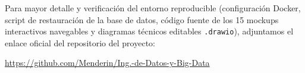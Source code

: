 \documentclass[11pt,letterpaper]{article}
\begin{document}
Para mayor detalle y verificación del entorno reproducible (configuración Docker, script de restauración de la base de datos, código fuente de los 15 mockups interactivos navegables y diagramas técnicos editables \texttt{.drawio}), adjuntamos el enlace oficial del repositorio del proyecto:

\begin{center}
    \url{https://github.com/Menderin/Ing.-de-Datos-y-Big-Data}
\end{center}
\end{document}

